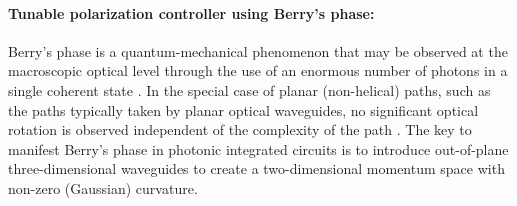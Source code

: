 \documentclass[../report.tex]{subfiles}
\begin{document}
\begin{itemize}[leftmargin=*]
		\paragraph*{Tunable polarization controller using Berry's phase:}Berry’s phase is a quantum-mechanical phenomenon that may be observed at the macroscopic optical level through the use of an enormous number of photons in a single coherent state \cite{chiao_manifestations_1986}. In the special case of planar (non-helical) paths, such as the paths typically taken by planar optical waveguides, no significant optical rotation is observed independent of the complexity of the path \cite{tomita_observation_1986}. The key to manifest Berry’s phase in photonic integrated circuits is to introduce out-of-plane three-dimensional waveguides to create a two-dimensional momentum space with non-zero (Gaussian) curvature.
		
	\end{itemize}
	
\end{document}
